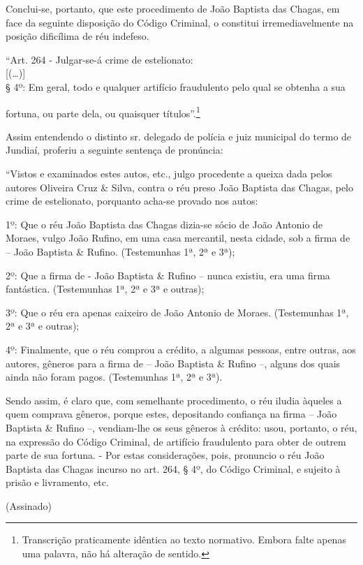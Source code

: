 {Conclui-se, portanto, que este procedimento de João Baptista das Chagas,
em face da seguinte disposição do Código Criminal, o constitui
irremediavelmente na posição dificílima de réu indefeso.

``Art. 264 - Julgar-se-á crime de estelionato:\\
{[}(\ldots{}){]}\\
§ 4º: Em geral, todo e qualquer artifício fraudulento pelo qual se
obtenha a sua

fortuna, ou parte dela, ou quaisquer títulos''.\footnote{Transcrição
  praticamente idêntica ao texto normativo. Embora falte apenas uma
  palavra, não há alteração de sentido.}

Assim entendendo o distinto sr. delegado de polícia e juiz municipal do
termo de Jundiaí, proferiu a seguinte sentença de pronúncia:

``Vistos e examinados estes autos, etc., julgo procedente a queixa dada
pelos autores Oliveira Cruz \& Silva, contra o réu preso João Baptista
das Chagas, pelo crime de estelionato, porquanto acha-se provado nos
autos:

1º: Que o réu João Baptista das Chagas dizia-se sócio de João Antonio de
Moraes, vulgo João Rufino, em uma casa mercantil, nesta cidade, sob a
firma de -- João Baptista \& Rufino. (Testemunhas 1ª, 2ª e 3ª);

2º: Que a firma de - João Baptista \& Rufino -- nunca existiu, era uma
firma fantástica. (Testemunhas 1ª, 2ª e 3ª e outras);

3º: Que o réu era apenas caixeiro de João Antonio de Moraes.
(Testemunhas 1ª, 2ª e 3ª e outras);

4º: Finalmente, que o réu comprou a crédito, a algumas pessoas, entre
outras, aos autores, gêneros para a firma de -- João Baptista \& Rufino
--, alguns dos quais ainda não foram pagos. (Testemunhas 1ª, 2ª e 3ª).

Sendo assim, é claro que, com semelhante procedimento, o réu iludia
àqueles a quem comprava gêneros, porque estes, depositando confiança na
firma -- João Baptista \& Rufino --, vendiam-lhe os seus gêneros à
crédito: usou, portanto, o réu, na expressão do Código Criminal, de
artifício fraudulento para obter de outrem parte de sua fortuna. - Por
estas considerações, pois, pronuncio o réu João Baptista das Chagas
incurso no art. 264, § 4º, do Código Criminal, e sujeito à prisão e
livramento, etc.

\begin{flushright}
(Assinado)


\end{flushright}}
